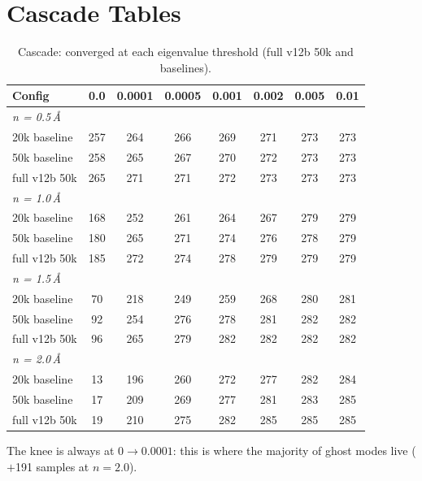 \documentclass[11pt,a4paper]{article}
\theoremstyle{definition}
\begin{document}
\section{Cascade Tables}
\label{app:cascade}

\begin{table}[h]
\centering\small
\caption{Cascade: converged at each eigenvalue threshold (full v12b 50k
  and baselines).}
\label{tab:cascade}
\begin{tabular}{lccccccc}
\toprule
Config & 0.0 & 0.0001 & 0.0005 & 0.001 & 0.002 & 0.005 & 0.01 \\
\midrule
\multicolumn{8}{l}{\textit{n = 0.5\,\AA}} \\
\quad 20k baseline    & 257 & 264 & 266 & 269 & 271 & 273 & 273 \\
\quad 50k baseline    & 258 & 265 & 267 & 270 & 272 & 273 & 273 \\
\quad full v12b 50k   & 265 & 271 & 271 & 272 & 273 & 273 & 273 \\
\midrule
\multicolumn{8}{l}{\textit{n = 1.0\,\AA}} \\
\quad 20k baseline    & 168 & 252 & 261 & 264 & 267 & 279 & 279 \\
\quad 50k baseline    & 180 & 265 & 271 & 274 & 276 & 278 & 279 \\
\quad full v12b 50k   & 185 & 272 & 274 & 278 & 279 & 279 & 279 \\
\midrule
\multicolumn{8}{l}{\textit{n = 1.5\,\AA}} \\
\quad 20k baseline    & 70  & 218 & 249 & 259 & 268 & 280 & 281 \\
\quad 50k baseline    & 92  & 254 & 276 & 278 & 281 & 282 & 282 \\
\quad full v12b 50k   & 96  & 265 & 279 & 282 & 282 & 282 & 282 \\
\midrule
\multicolumn{8}{l}{\textit{n = 2.0\,\AA}} \\
\quad 20k baseline    & 13  & 196 & 260 & 272 & 277 & 282 & 284 \\
\quad 50k baseline    & 17  & 209 & 269 & 277 & 281 & 283 & 285 \\
\quad full v12b 50k   & 19  & 210 & 275 & 282 & 285 & 285 & 285 \\
\bottomrule
\end{tabular}
\end{table}

The knee is always at $0 \to 0.0001$: this is where the majority of ghost
modes live ($+$191 samples at $n{=}2.0$).
\end{document}
